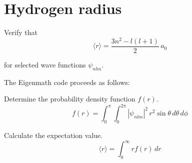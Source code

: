 

\section*{Hydrogen radius}

Verify that
\begin{equation*}
\langle r\rangle=\frac{3n^2-l(l+1)}{2}\,a_0
\tag{1}
\end{equation*}

for selected wave functions $\psi_{nlm}$.

\bigskip
The Eigenmath code proceeds as follows:

\bigskip
Determine the probability density function $f(r)$.
\begin{equation*}
f(r)=\int_0^\pi\int_0^{2\pi}|\psi_{nlm}|^2\,r^2\sin\theta\,d\theta\,d\phi
\end{equation*}

Calculate the expectation value.
\begin{equation*}
\langle r\rangle=\int_0^\infty rf(r)\,dr
\end{equation*}


